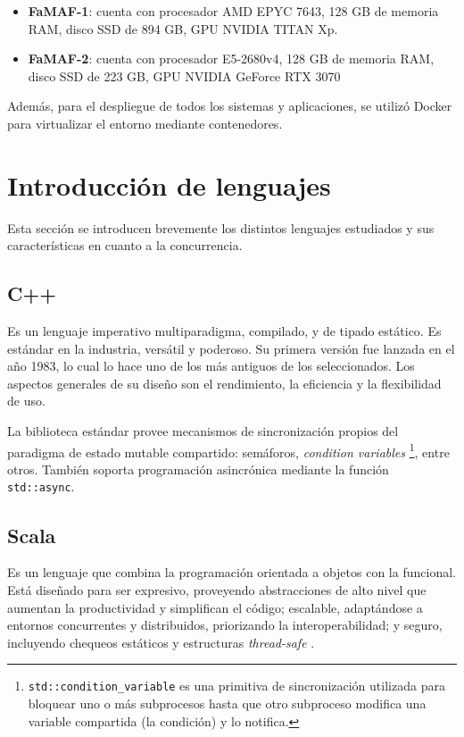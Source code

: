 \documentclass[11pt]{article}
\let\Oldsection\section
\renewcommand{\section}{\FloatBarrier\Oldsection}
\let\Oldsubsection\subsection
\renewcommand{\subsection}{\FloatBarrier\Oldsubsection}
\newcommand{\english}[1]{\textit{#1}}
\begin{document}
\begin{itemize}
    \item \textbf{FaMAF-1}: cuenta con procesador AMD EPYC 7643, 128 GB de memoria RAM, disco SSD de 894 GB, GPU NVIDIA TITAN Xp.
    \item \textbf{FaMAF-2}: cuenta con procesador E5-2680v4, 128 GB de memoria RAM, disco SSD de 223 GB, GPU NVIDIA GeForce RTX 3070
\end{itemize}

Además, para el despliegue de todos los sistemas y aplicaciones, se utilizó Docker \cite{com:docker} para virtualizar el entorno mediante contenedores.

\newpage

\section{Introducción de lenguajes}

Esta sección se introducen brevemente los distintos lenguajes estudiados y sus características en cuanto a la concurrencia.

\subsection{C++}

Es un lenguaje imperativo multiparadigma, compilado, y de tipado estático. Es estándar en la industria, versátil y poderoso. Su primera versión fue lanzada en el año 1983, lo cual lo hace uno de los más antiguos de los seleccionados. Los aspectos generales de su diseño son el rendimiento, la eficiencia y la flexibilidad de uso.

La biblioteca estándar provee mecanismos de sincronización propios del paradigma de estado mutable compartido: semáforos, \english{condition variables} \footnote{\lstinline{std::condition_variable} es una primitiva de sincronización utilizada para bloquear uno o más subprocesos hasta que otro subproceso modifica una variable compartida (la condición) y lo notifica.}, entre otros. También soporta programación asincrónica mediante la función \lstinline{std::async}.

\subsection{Scala}

Es un lenguaje que combina la programación orientada a objetos con la funcional. Está diseñado para ser expresivo, proveyendo abstracciones de alto nivel que aumentan la productividad y simplifican el código; escalable, adaptándose a entornos concurrentes y distribuidos, priorizando la interoperabilidad; y seguro, incluyendo chequeos estáticos y estructuras \english{thread-safe} \cite{com:scala}.
\end{document}
